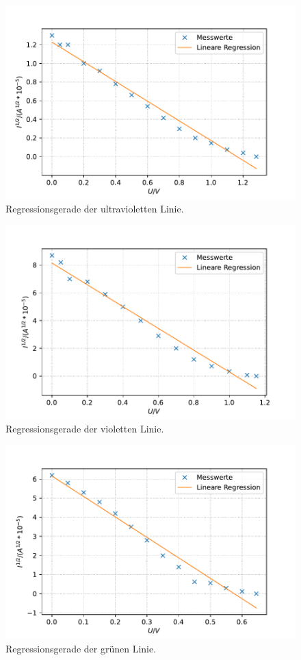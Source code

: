 \begin{figure}
  \center
  \caption{Regressionsgerade der ultravioletten Linie.}\label{fig:spek1}
  \includegraphics[width=0.8\linewidth]{pictures/spek1.pdf}
\end{figure}

\begin{figure}
  \center
  \caption{Regressionsgerade der violetten Linie.}\label{fig:spek2}
  \includegraphics[width=0.8\linewidth]{pictures/spek2.pdf}
\end{figure}

\begin{figure}
  \center
  \caption{Regressionsgerade der grünen Linie.}\label{fig:spek3}
  \includegraphics[width=0.8\linewidth]{pictures/spek3.pdf}
\end{figure}

